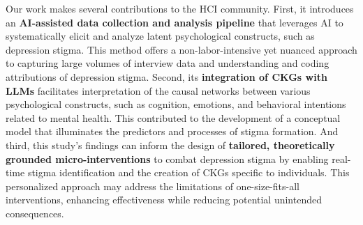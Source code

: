Our work makes several contributions to the HCI community. 
First, it introduces an \textbf{AI-assisted data collection and analysis pipeline} that leverages AI to systematically elicit and analyze latent psychological constructs, such as depression stigma.
This method offers a non-labor-intensive yet nuanced approach to capturing large volumes of interview data and understanding and coding attributions of depression stigma.
Second, its \textbf{integration of CKGs with LLMs} facilitates interpretation of the causal networks between various psychological constructs, such as cognition, emotions, and behavioral intentions related to mental health. 
This contributed to the development of a conceptual model that illuminates the predictors and processes of stigma formation.
And third, this study's findings can inform the design of \textbf{tailored, theoretically grounded micro-interventions} to combat depression stigma by enabling real-time stigma identification and the creation of CKGs specific to individuals.
This personalized approach may address the limitations of one-size-fits-all interventions, enhancing effectiveness while reducing potential unintended consequences.












